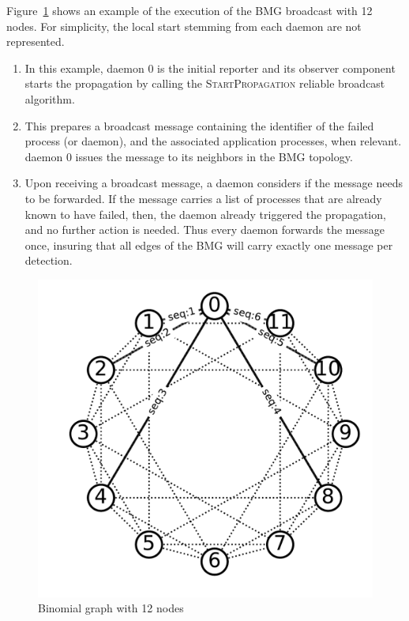 \documentclass[sigconf]{acmart}
\begin{document}
Figure~\ref{fig:bmg} shows an example of the execution of the BMG broadcast 
with 12 nodes. For simplicity, the local start stemming from each daemon are not 
represented. 

\begin{enumerate}
 \item In this example, daemon 0 is the initial reporter and its observer component starts the propagation by calling the \textsc{StartPropagation} reliable broadcast algorithm.
 \item This prepares a broadcast message containing the identifier of the
 failed process (or daemon), and the associated application processes, when relevant. 
 daemon 0 issues the message to its neighbors in the BMG topology.
 \item Upon receiving a broadcast message, a daemon considers if the message needs 
 to be forwarded. If the message carries a list of processes that are already known to
 have failed, then, the daemon already triggered the propagation, and no further 
 action is needed. Thus every daemon forwards the message once, insuring that 
 all edges of the BMG will carry exactly one message per detection. 
\end{enumerate}


\begin{figure}
  \centering
  \includegraphics[width=\linewidth]{BMG_seq.pdf}
  \caption{Binomial graph with 12 nodes}
  \label{fig:bmg}
\end{figure}
\end{document}
